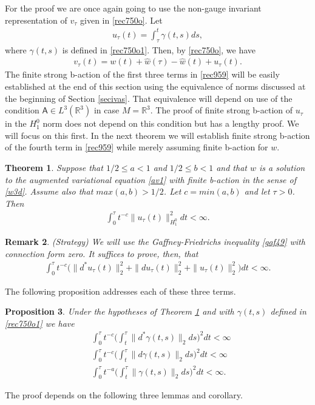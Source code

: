 \documentclass[12pt]{article}
\newtheorem{theorem}{Theorem}[section]
\newtheorem{proposition}[theorem]{Proposition}
\newtheorem{remark}[theorem]{Remark}
\def \({\Big(}
\def \){\Big)}
\def \R{\mathbb R}
\def \As{\mathsf{A}}
\def \eref{\eqref}
\numberwithin{equation}{section}
\begin{document}
For the proof we are once again  going to use the non-gauge invariant
 representation of $v_\tau$ given in \eref{rec750o}.
      Let
\begin{align}
u_\tau(t) = \int_\tau^t \gamma(t,s) ds, \label{rec960}
\end{align}
where $\gamma(t,s)$ is defined in \eref{rec750o1}.
Then, by \eref{rec750o}, we have
     \begin{align}
v_\tau(t) =w(t) +  \hat w(\tau) - \hat w(t)     +u_\tau(t).     \label{rec959}
\end{align}    
The  finite strong b-action of the first three terms in \eref{rec959} will be easily  established at
 the end of this section using the equivalence of norms
discussed at the beginning of Section \ref{secivas}. That equivalence will depend on use of the condition
$\As \in L^3(\R^3)$ in case $M = \R^3$.  The proof of finite  strong b-action of $u_\tau$ in the $H_1^0$ norm 
does not depend on this condition but  has a lengthy proof. We will focus on this first. 
  In the next theorem we will establish  finite strong b-action of the fourth term in \eref{rec959}
while merely assuming  finite b-action for $w$.

\begin{theorem} \label{thmrec9c}  
Suppose that $1/2 \le a < 1$ and $1/2\le b <1$ and that $w$ 
 is a solution to  the augmented variational equation \eref{av1} with finite b-action in the sense 
of \eref{w3d}. 
Assume also that $max(a,b) > 1/2$.  Let $c = min(a,b)$ and
let  $\tau >0$.   
  Then
 \begin{align}
 \int_0^\tau t^{-c} \|u_\tau(t)\|_{H_1^0}^2 dt < \infty.  \label{rec938o}
 \end{align}
\end{theorem}


\begin{remark}{\rm (Strategy) We will use the Gaffney-Friedrichs inequality \eref{gaf49} 
with connection form zero.
It  suffices to prove, then,  that 
\begin{align}
\int_0^\tau t^{-c} \Big( \|d^* u_\tau(t)\|_2^2 + \| d u_\tau(t)\|_2^2 + \|u_\tau(t)\|_2^2 \Big) dt < \infty.  \label{rec939o}
\end{align}
}
\end{remark}
The following proposition addresses each of these three terms.

 \begin{proposition} \label{propfa1} 
Under the hypotheses of Theorem \ref{thmrec9c} and with $\gamma(t,s)$ defined in \eref{rec750o1} we have  
\begin{align}
 &\int_0^\tau t^{-c} \(\int_t^\tau  \|d^*\gamma(t, s)\|_2 ds \)^2 dt < \infty \label{rec940o}\\
 & \int_0^\tau t^{-c} \(\int_t^\tau  \|d\gamma(t, s)\|_2 ds \)^2 dt < \infty  \label{rec941o}\\
&\int_0^\tau t^{-a} \(\int_t^\tau \|\gamma(t,s)\|_2 ds \)^2 dt < \infty.   \label{rec942o}
 \end{align}
 \end{proposition}
The proof depends on the following three lemmas and corollary.
\end{document}
